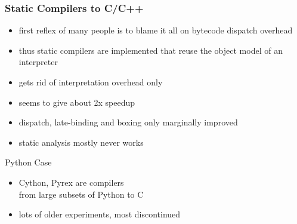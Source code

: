 \documentclass[utf8x]{beamer}
\begin{document}
\begin{frame}
  \frametitle{Static Compilers to C/C++}
  \begin{itemize}
      \item first reflex of many people is to blame it all on bytecode dispatch overhead
      \item thus static compilers are implemented that reuse the object model of an interpreter
      \item gets rid of interpretation overhead only
      \item seems to give about 2x speedup
      \pause
      \item dispatch, late-binding and boxing only marginally improved
      \item static analysis mostly never works
  \end{itemize}
  \pause
  \begin{block}{Python Case}
    \begin{itemize}
    \item \alert{Cython}, \alert{Pyrex} are compilers\\
    from large subsets of Python to C
    \item lots of older experiments, most discontinued
    \end{itemize}
  \end{block}
\end{frame}
\end{document}
